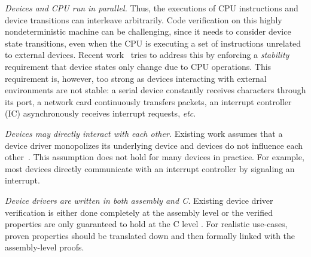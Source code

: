 {\em Devices and CPU run in parallel.} Thus, the executions of CPU
instructions and device transitions can interleave arbitrarily. Code
verification on this highly nondeterministic machine can be
challenging, since it needs to consider device state transitions, even
when the CPU is executing a set of instructions unrelated to external
devices. Recent
work~\cite{Alkassar:OSVE09,Alkassar:VSTTE08-225,Alkassar:VSTTE2010-71}
tries to address this by enforcing a {\it stability} requirement
that device states only change due to CPU operations. 
%
%
This requirement is, however, 
too strong as devices interacting with 
external environments are not stable: a serial device constantly
receives characters through its port, a network card continuously
transfers packets, an interrupt controller (IC) asynchronously
receives interrupt requests, {\it etc}.

{\em Devices may directly interact with each other.} Existing work
assumes that a device driver monopolizes its underlying device and
devices do not influence each other~\cite{Alkassar:VSTTE08-225}. This
assumption does not hold for many devices in practice. For example,
most devices directly communicate with an interrupt controller by
signaling an interrupt.

{\em Device drivers are written in both assembly and C.}  Existing
device driver verification is either done completely at the assembly
level \cite{Alkassar:VSTTE08-225,duan2013} or the verified properties
are only guaranteed to hold at the C level \cite{Ryzhyk_09,Ryzhyk14}.
For realistic use-cases, proven properties should be 
translated down and then formally linked with
the assembly-level proofs.

